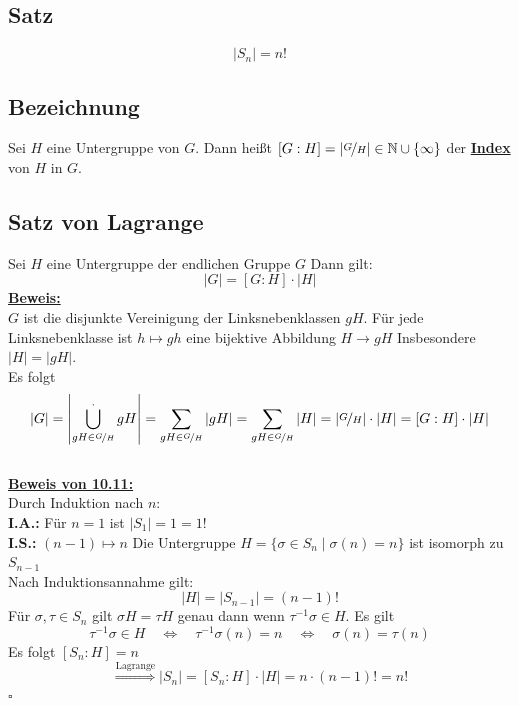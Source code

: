 \subsection{Satz} %
\label{sub:satz}
\[
	| S_n | = n! 
\]

\subsection{Bezeichnung} %
\label{sub:bezeichnung}
Sei $H$ eine Untergruppe von $G$. Dann heißt $[G : H]= \left| \nicefrac{G}{H} \right| \in \mathds{N} \cup \{ \infty\}$ der \underline{\textbf{Index}} von $H$ in $G$.

\subsection{Satz von Lagrange} %
\label{sub:satz_von_lagrange}
Sei $H$ eine Untergruppe der endlichen Gruppe $G$ Dann gilt:
\[
	| G| = [G : H] \cdot  |H|
\]
\underline{\textbf{Beweis:}} \\
$G$ ist die disjunkte Vereinigung der Linksnebenklassen $gH$. Für jede Linksnebenklasse ist $h \mapsto gh$ eine bijektive Abbildung $H \to gH$
Insbesondere $| H| = |gH|$. \\
Es folgt
\[
	 |G| = \left|  \bigcup\limits_{gH \in \nicefrac{G}{H}}^{.} gH \right| = \sum\limits_{gH \in \nicefrac{G}{H}} |gH| = 
	 \sum\limits_{gH \in \nicefrac{G}{H}} |H| = | \nicefrac{G}{H}| \cdot |H|= [G : H] \cdot |H|
\]
\vspace{\baselineskip} \\
\underline{\textbf{Beweis von 10.11:}} \\
Durch Induktion nach $n$: \\
\textbf{I.A.:} Für $n=1$ ist $|S_1| = 1 = 1!$ \\
\textbf{I.S.:} $(n-1) \mapsto n$ Die Untergruppe $H= \{ \sigma \in S_n \mid \sigma(n)=n \}$ ist isomorph zu $S_{n-1}$
\vspace{10pt} \\
Nach Induktionsannahme gilt:
\[
	|H|= |S_{n-1}| = (n-1)!
\]
Für $\sigma, \tau  \in S_n$ gilt $\sigma H = \tau H$ genau dann wenn $\tau ^{-1} \sigma \in H$. Es gilt
\[
	\tau ^{-1} \sigma \in H \quad \Leftrightarrow \quad \tau ^{-1} \sigma(n)= n \quad \Leftrightarrow \quad \sigma(n)= \tau(n)
\]
Es folgt $[S_n : H] = n$
\[
	\overset{\text{Lagrange}}{\Rightarrow } |S_n| = [S_n : H] \cdot  |H| = n \cdot (n-1)!= n!
\]
\hfill \( \square \)
\vspace{\baselineskip} \\

